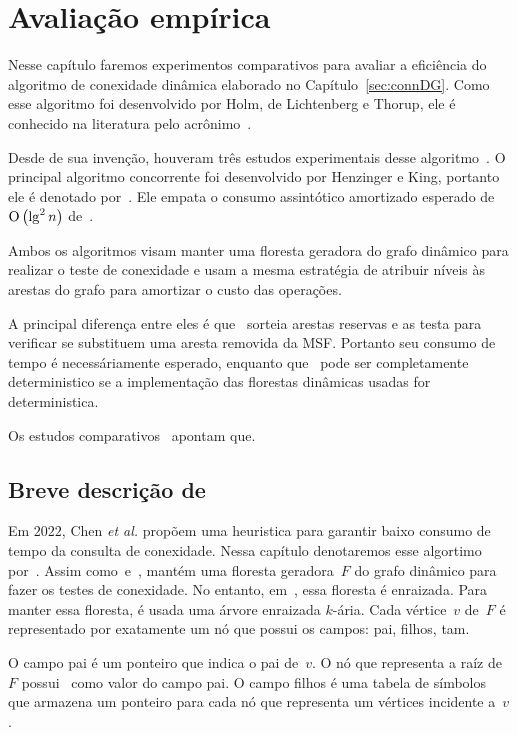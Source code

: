 \chapter{Avaliação empírica}
\label{sec:avaliacao-empirica}

Nesse capítulo faremos experimentos comparativos para avaliar a eficiência do algoritmo de conexidade dinâmica elaborado no Capítulo~\ref{sec:connDG}. Como esse algoritmo foi desenvolvido  por Holm, de Lichtenberg e Thorup, ele é conhecido na literatura pelo acrônimo~\HDT.

Desde de sua invenção, houveram três estudos experimentais desse algoritmo~\cite{EmpiricalStudy1997, EmpiricalStudy2002, Zaroliagis2002}.
O principal algoritmo concorrente foi desenvolvido por Henzinger e King, portanto ele é denotado por~\HK. Ele empata o consumo assintótico amortizado esperado de $\text{O}\left(\lg^2 n\right)$ de~\HDT.

Ambos os algoritmos visam manter uma floresta geradora do grafo dinâmico para realizar o teste de conexidade e usam a mesma estratégia de atribuir níveis às arestas do grafo para amortizar o custo das operações.

A principal diferença entre eles é que~\HK{} sorteia arestas reservas e as testa para verificar se substituem uma aresta removida da MSF. Portanto seu consumo de tempo é necessáriamente esperado, enquanto que~\HDT{} pode ser completamente deterministico se a implementação das florestas dinâmicas usadas for deterministica. 



Os estudos comparativos~\cite{EmpiricalStudy1997, EmpiricalStudy2002, Zaroliagis2002} apontam que.


\section{Breve descrição de~\CLHB{}}


Em $2022$, Chen \textit{et al.}\cite{QC22} propõem uma heuristica para garantir baixo consumo de tempo da consulta de conexidade. Nessa capítulo denotaremos esse algortimo por~\CLHB.
Assim como~\HDT e~\HK, \CLHB{} mantém uma floresta geradora~$F$ do grafo dinâmico para fazer os testes de conexidade.
No entanto, em~\CLHB{}, essa floresta é enraizada.
Para manter essa floresta, é usada uma árvore enraizada $k$-ária.
Cada vértice~$v$ de~$F$ é representado por exatamente um nó que possui os campos: pai, filhos, tam.

O campo pai é um ponteiro que indica o pai de~$v$. O nó que representa a raíz de~$F$ possui~\Nil{} como valor do campo pai.
O campo filhos é uma tabela de símbolos que armazena um ponteiro para cada nó que representa um vértices incidente a~$v$.


